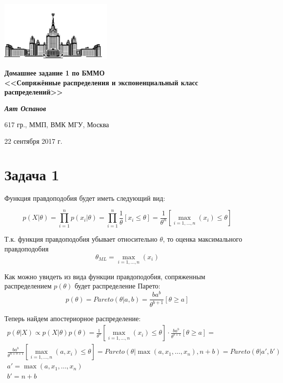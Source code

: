 \documentclass[12pt, a4paper]{article}
\begin{document}
    \begin{singlespace}
    \begin{center}
        \includegraphics[height=3cm]{msu.png}

        {\large\textbf{Домашнее задание 1 по БММО\\
        <<Сопряжённые распределения и экспоненциальный класс распределений>>}\\}

        \vspace{0.3cm}

        \textit{\textbf{Аят Оспанов}}

        617 гр., ММП, ВМК МГУ, Москва

        22 сентября 2017 г.
    \end{center}
    \end{singlespace}

    \section{Задача 1}

    Функция правдоподобия будет иметь следующий вид:

    $$p(X|\theta) = \displaystyle\prod_{i=1}^n p(x_i|\theta) =
    \displaystyle\prod_{i=1}^n \frac{1}{\theta}[x_i \leq \theta] =
    \frac{1}{\theta^n}[\max_{i=1,\dots,n}(x_i) \leq \theta]$$

    Т.к. функция правдоподобия убывает относительно $\theta$, то оценка максимального правдоподобия
    $$\theta_{ML} = \max_{i=1,\dots,n}(x_i)$$

    Как можно увидеть из вида функции правдоподобия, сопряженным распределением $p(\theta)$ будет распределение Парето:
    $$p(\theta) = Pareto(\theta|a,b) = \frac{ba^b}{\theta^{b+1}}[\theta \geq a]$$

    Теперь найдем апостериорное распределение:
    \begin{gather*}
        p(\theta|X) \propto p(X|\theta) p(\theta) =
        \frac{1}{\theta^n}[\max_{i=1,\dots,n}(x_i) \leq \theta] \cdot
        \frac{ba^b}{\theta^{b+1}}[\theta \geq a] =\\
        \frac{ba^b}{\theta^{n+b+1}}[\max_{i=1,\dots,n}(a, x_i) \leq \theta] =
        Pareto(\theta|\max(a, x_1, \dots, x_n), n+b) = Pareto(\theta|a',b')\\
        a' = \max(a, x_1, \dots, x_n)\\
        b' = n + b
    \end{gather*}
\end{document}
